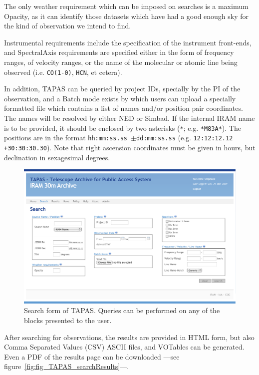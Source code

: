 			The only weather requirement which can be imposed on
			searches is a maximum Opacity, as it can identify those
			datasets which have had a good enough sky for the kind
			of observation we intend to find.
			
			Instrumental requirements include the specification of
			the instrument front-ends, and Spectral\-Axis requirements
			are specified either in the form of frequency ranges,
			of velocity ranges, or the name of the molecular or
			atomic line being observed (i.e. \texttt{CO(1-0)},
			\texttt{HCN}, et cetera).
			
			In addition, TAPAS can be queried by project IDs,
			specially by the PI of the observation, and a Batch
			mode exists by which users can upload a specially
			formatted file which contains a list of names and/or
			position pair coordinates. The names will be resolved by
			either NED or Simbad. If the internal IRAM name is
			to be provided, it should be enclosed by two asterisks
			(\texttt{*}; e.g. \texttt{*M83A*}). The positions are in
			the format \texttt{hh:mm:ss.ss $\pm$dd:mm:ss.ss} (e.g.
			\texttt{12:12:12.12 +30:30:30.30}). Note that right
			ascension coordinates must be given in hours, but
			declination in sexagesimal degrees.
			
			\begin{figure}[tbp]
				\centering
					\includegraphics[width=\textwidth]
					{fig/TAPAS_searchForm.pdf}
				\caption[TAPAS search form]
				{Search form of TAPAS. Queries can be performed
				on any of the blocks presented to the user.}
				\label{fig:fig_TAPAS_searchForm}
			\end{figure}
			
			After searching for observations, the results are
			provided in HTML form, but also Comma Separated Values
			(CSV) ASCII files, and VOTables can be generated.
			Even a PDF of the results page can be downloaded
			---see figure~\ref{fig:fig_TAPAS_searchResults}---.
			
